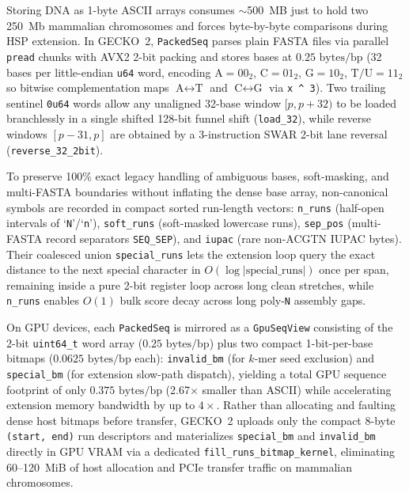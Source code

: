 \documentclass[pdflatex,sn-vancouver,Numbered]{sn-jnl}
\begin{document}
Storing DNA as 1-byte ASCII arrays consumes $\sim$500~MB just to hold two 250~Mb mammalian chromosomes and forces byte-by-byte comparisons during HSP extension. In GECKO~2, \texttt{PackedSeq} parses plain FASTA files via parallel \texttt{pread} chunks with AVX2 2-bit packing and stores bases at $0.25\text{ bytes/bp}$ (32 bases per little-endian \texttt{u64} word, encoding $\text{A}=00_2$, $\text{C}=01_2$, $\text{G}=10_2$, $\text{T/U}=11_2$ so bitwise complementation maps $\text{A}\leftrightarrow\text{T}$ and $\text{C}\leftrightarrow\text{G}$ via \texttt{x \^{} 3}). Two trailing sentinel \texttt{0u64} words allow any unaligned 32-base window $[p, p+32)$ to be loaded branchlessly in a single shifted 128-bit funnel shift (\texttt{load\_32}), while reverse windows $[p-31, p]$ are obtained by a 3-instruction SWAR 2-bit lane reversal (\texttt{reverse\_32\_2bit}).

To preserve 100\% exact legacy handling of ambiguous bases, soft-masking, and multi-FASTA boundaries without inflating the dense base array, non-canonical symbols are recorded in compact sorted run-length vectors: \texttt{n\_runs} (half-open intervals of `\texttt{N}'/`\texttt{n}'), \texttt{soft\_runs} (soft-masked lowercase runs), \texttt{sep\_pos} (multi-FASTA record separators \texttt{SEQ\_SEP}), and \texttt{iupac} (rare non-ACGTN IUPAC bytes). Their coalesced union \texttt{special\_runs} lets the extension loop query the exact distance to the next special character in $O(\log |\text{special\_runs}|)$ once per span, remaining inside a pure 2-bit register loop across long clean stretches, while \texttt{n\_runs} enables $O(1)$ bulk score decay across long poly-\texttt{N} assembly gaps.

On GPU devices, each \texttt{PackedSeq} is mirrored as a \texttt{GpuSeqView} consisting of the 2-bit \texttt{uint64\_t} word array ($0.25\text{ bytes/bp}$) plus two compact 1-bit-per-base bitmaps ($0.0625\text{ bytes/bp}$ each): \texttt{invalid\_bm} (for $k$-mer seed exclusion) and \texttt{special\_bm} (for extension slow-path dispatch), yielding a total GPU sequence footprint of only $0.375\text{ bytes/bp}$ (2.67$\times$ smaller than ASCII) while accelerating extension memory bandwidth by up to $4\times$. Rather than allocating and faulting dense host bitmaps before transfer, GECKO~2 uploads only the compact 8-byte \texttt{(start, end)} run descriptors and materializes \texttt{special\_bm} and \texttt{invalid\_bm} directly in GPU VRAM via a dedicated \texttt{fill\_runs\_bitmap\_kernel}, eliminating 60--120~MiB of host allocation and PCIe transfer traffic on mammalian chromosomes.
\end{document}
